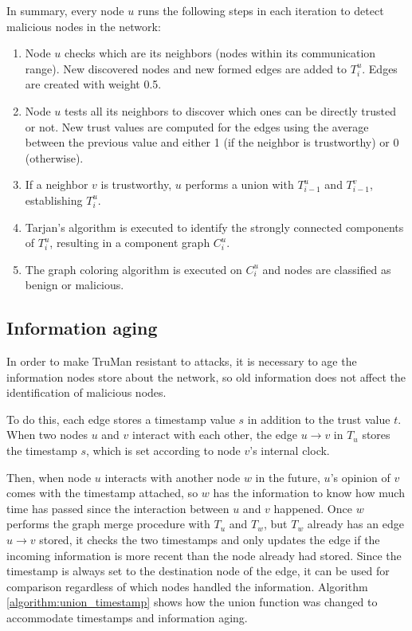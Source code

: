 In summary, every node $u$ runs the following steps in each iteration to detect malicious nodes in the network:

\begin{enumerate}
	\item Node $u$ checks which are its neighbors (nodes within its communication range).
		  New discovered nodes and new formed edges are added to $T^u_i$.
		  Edges are created with weight 0.5.
	\item Node $u$ tests all its neighbors to discover which ones can be directly trusted or not.
		  New trust values are computed for the edges using the average between the previous value and either 1 (if the neighbor is trustworthy) or 0 (otherwise).
	\item If a neighbor $v$ is trustworthy, $u$ performs a union with $T^u_{i-1}$ and $T^v_{i-1}$, establishing $T^u_i$.
	\item Tarjan's algorithm is executed to identify the strongly connected components of $T^u_i$, resulting in a component graph $C^u_i$.
	\item The graph coloring algorithm is executed on $C^u_i$ and nodes are classified as benign or malicious.
\end{enumerate}

\subsection{Information aging}

In order to make TruMan resistant to attacks, it is necessary to age the information nodes store about the network, so old information does not affect the identification of malicious nodes.

To do this, each edge stores a timestamp value $s$ in addition to the trust value $t$.
When two nodes $u$ and $v$ interact with each other, the edge $u\rightarrow v$ in $T_u$ stores the timestamp $s$, which is set according to node $v$'s internal clock.

Then, when node $u$ interacts with another node $w$ in the future, $u$'s opinion of $v$ comes with the timestamp attached, so $w$ has the information to know how much time has passed since the interaction between $u$ and $v$ happened.
Once $w$ performs the graph merge procedure with $T_u$ and $T_w$, but $T_w$ already has an edge $u\rightarrow v$ stored, it checks the two timestamps and only updates the edge if the incoming information is more recent than the node already had stored.
Since the timestamp is always set to the destination node of the edge, it can be used for comparison regardless of which nodes handled the information. 
Algorithm \autoref{algorithm:union_timestamp} shows how the union function was changed to accommodate timestamps and information aging.

